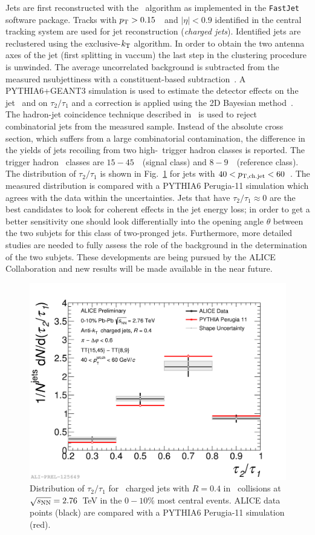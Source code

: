 \documentclass[10pt]{article}
\begin{document}
Jets are first reconstructed with the \antikt\ algorithm as implemented in the \texttt{FastJet}\cite{Cacciari:2012a} software package.
Tracks with $p_{\rm T}>0.15$~\GeVc\ and $|\eta|<0.9$ identified in the central tracking system
are used for jet reconstruction (\emph{charged jets}). 
Identified jets are reclustered using the exclusive-$k_{\rm T}$ algorithm. In order to obtain the two antenna axes of the jet (first splitting in vaccum) 
the last step in the clustering procedure is unwinded.
The average uncorrelated background is subtracted from the measured nsubjettiness with a constituent-based subtraction~\cite{Berta:2014}.
A PYTHIA6+GEANT3 simulation is used to estimate the detector effects on the jet \pt\ and on $\tau_2/\tau_1$ and a correction is applied using the 2D Bayesian method~\cite{Dagostini:1995}.
The hadron-jet coincidence technique described in~\cite{ALICE:2015g} is used to reject combinatorial jets from the measured sample. 
Instead of the absolute cross section, which suffers from a large combinatorial contamination, the difference in the yields of jets recoiling from two high-\pt\ trigger hadron classes is reported. 
The trigger hadron \pt\ classes are $15-45$~\GeVc\ (signal class) and $8-9$~\GeVc\ (reference class). The distribution of $\tau_2/\tau_1$ is shown in Fig.~\ref{fig:nsubjettiness} for jets with $40<p_{\rm T,ch.jet}<60$~\GeVc.
The measured distribution is compared with a PYTHIA6 Perugia-11 simulation which agrees with the data within the uncertainties. 
Jets that have $\tau_2/\tau_1\approx0$ are the best candidates to look for coherent effects in the jet energy loss; 
in order to get a better sensitivity one should look differentially into the opening angle $\theta$ between the two subjets for this class of two-pronged jets.
Furthermore, more detailed studies are needed to fully assess the role of the background in the determination of the two subjets. 
These developments are being pursued by the ALICE
Collaboration and new results will be made available in the near future.
\begin{figure}[tb]
\centering
\includegraphics[width=.5\textwidth]{img/2017-Feb-03-Tau2to1_40to60_Full_Results_0}
\caption{Distribution of $\tau_2/\tau_1$ for \antikt\ charged jets with $R=0.4$ in \PbPb\ collisions at $\sqrt{s_{\rm NN}}=2.76$~TeV in the $0-10$\% most central events. 
ALICE data points (black) are compared with a PYTHIA6 Perugia-11 simulation (red).}
\label{fig:nsubjettiness}
\end{figure}
\end{document}
